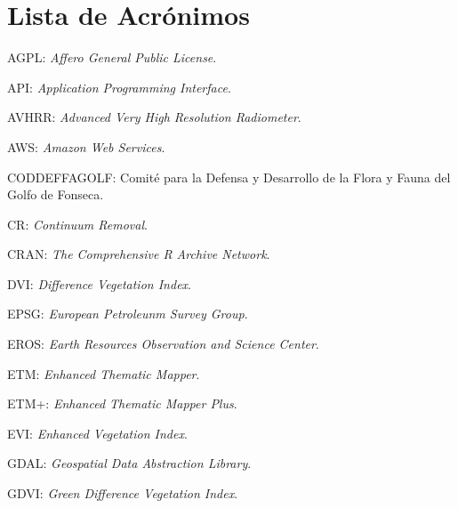 


\chapter*{Lista de Acrónimos}

AGPL: \textit{Affero General Public License}.

API: \textit{Application Programming Interface}.

AVHRR: \textit{Advanced Very High Resolution Radiometer}.

AWS: \textit{Amazon Web Services}.

CODDEFFAGOLF: Comité para la Defensa y Desarrollo de la Flora y Fauna del Golfo de Fonseca.

CR: \textit{Continuum Removal}.

CRAN: \textit{The Comprehensive R Archive Network}.

DVI: \textit{Difference Vegetation Index}.

EPSG: \textit{European Petroleunm Survey Group}.

EROS: \textit{Earth Resources Observation and Science Center}.

ETM: \textit{Enhanced Thematic Mapper}.

ETM+: \textit{Enhanced Thematic Mapper Plus}.

EVI: \textit{Enhanced Vegetation Index}.

GDAL: \textit{Geospatial Data Abstraction Library}.

GDVI: \textit{Green Difference Vegetation Index}.

